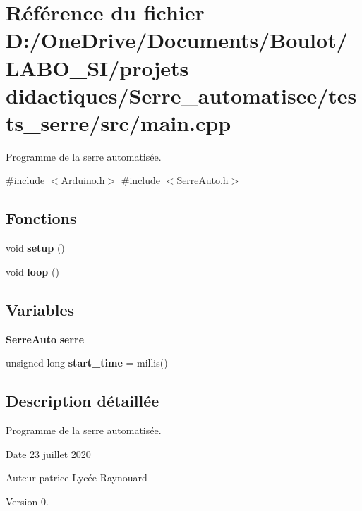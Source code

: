 \section{Référence du fichier D\+:/\+One\+Drive/\+Documents/\+Boulot/\+L\+A\+B\+O\+\_\+\+S\+I/projets didactiques/\+Serre\+\_\+automatisee/tests\+\_\+serre/src/main.cpp}
\label{main_8cpp}


Programme de la serre automatisée.  


{\ttfamily \#include $<$Arduino.\+h$>$}\newline
{\ttfamily \#include $<$Serre\+Auto.\+h$>$}\newline
\subsection*{Fonctions}
\begin{DoxyCompactItemize}
\item 
void \textbf{ setup} ()
\item 
void \textbf{ loop} ()
\end{DoxyCompactItemize}
\subsection*{Variables}
\begin{DoxyCompactItemize}
\item 
\textbf{ Serre\+Auto} \textbf{ serre}
\item 
unsigned long \textbf{ start\+\_\+time} = millis()
\end{DoxyCompactItemize}


\subsection{Description détaillée}
Programme de la serre automatisée. 

\begin{DoxyDate}{Date}
23 juillet 2020 
\end{DoxyDate}
\begin{DoxyAuthor}{Auteur}
patrice Lycée Raynouard 
\end{DoxyAuthor}
\begin{DoxyVersion}{Version}
0. 
\end{DoxyVersion}


